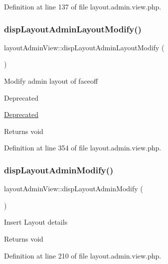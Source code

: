 Definition at line 137 of file layout.\+admin.\+view.\+php.

\mbox{\label{classlayoutAdminView_a1be4548859d4f3a913b33c4e8b395f51}} 
\subsubsection{\texorpdfstring{disp\+Layout\+Admin\+Layout\+Modify()}{dispLayoutAdminLayoutModify()}}
{\footnotesize\ttfamily layout\+Admin\+View\+::disp\+Layout\+Admin\+Layout\+Modify (\begin{DoxyParamCaption}{ }\end{DoxyParamCaption})}

Modify admin layout of faceoff \begin{DoxyRefDesc}{Deprecated}
\item[\hyperlink{deprecated__deprecated000018}{Deprecated}]\end{DoxyRefDesc}
\begin{DoxyReturn}{Returns}
void 
\end{DoxyReturn}


Definition at line 354 of file layout.\+admin.\+view.\+php.

\mbox{\label{classlayoutAdminView_a96a02667575c453953a50cc279443785}} 
\subsubsection{\texorpdfstring{disp\+Layout\+Admin\+Modify()}{dispLayoutAdminModify()}}
{\footnotesize\ttfamily layout\+Admin\+View\+::disp\+Layout\+Admin\+Modify (\begin{DoxyParamCaption}{ }\end{DoxyParamCaption})}

Insert Layout details \begin{DoxyReturn}{Returns}
void 
\end{DoxyReturn}


Definition at line 210 of file layout.\+admin.\+view.\+php.

